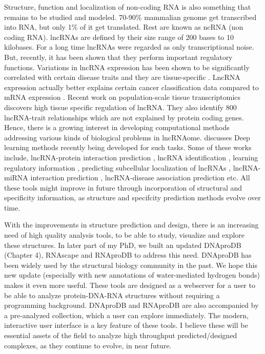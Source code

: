 Structure, function and localization of non-coding RNA is also something that remains to be studied and modeled. 70-90\% mammalian genome get transcribed into RNA, but only 1\% of it get translated. Rest are known as ncRNA (non coding RNA). lncRNAs are defined by their size range of 200 bases to 10 kilobases. For a long time lncRNAs were regarded as only transcriptional noise. But, recently, it has been shown that they perform important regulatory functions. Variations in lncRNA expression has been shown to be significantly correlated with certain disease traits \citep{wapinski2011long} and they are tissue-specific \citep{seifuddin2020lncrnakb}. LncRNA expression actually better explains certain cancer
classification data compared to mRNA expression \citep{al2019long}. Recent work on population-scale tissue transcriptomics \citep{de2021population} discovers high tissue specific regulation of lncRNA. They also identify 800 lncRNA-trait relationships which are not explained by protein coding genes. Hence, there is a growing interest in developing computational methods addressing various kinds of biological problems in lncRNAome. \citep{alam2020deep} discusses Deep learning methods recently being developed for
such tasks. Some of these works include, lncRNA-protein interaction prediction
\citep{pan2016ipminer, zhao2018bipartite, yi2018deep, zhan2019bgfe, peng2019rpiter}, lncRNA  identification \citep{baek2018lncrnanet,yang2018lncadeep, tripathi2016deeplnc},
learning regulatory information \citep{alam2019deepcnpp, alam2019deepel}, predicting subcellular localization of lncRNAs \citep{gudenas2018prediction},    lncRNA-miRNA interaction prediction \citep{huang2019predicting}, lncRNA-disease association prediction \citep{hu2019deep, xuan2019dual, al2019long, xuan2019graph} etc. All these tools might improve in future through incorporation of structural and specificity information, as structure and specifcity prediction methods evolve over time.

With the improvements in structure prediction and design, there is an increasing need of high quality analysis tools, to be able to study, visualize and explore these structures. In later part of my PhD, we built an updated DNAproDB (Chapter 4), RNAscape \citep{Mitra2024rnascape} and RNAproDB to address this need. DNAproDB \citep{Sagendorf2017, Sagendorf2020} has been widely used by the structural biology community in the past. We hope this new update (especially with new annotations of water-mediated hydrogen bonds) makes it even more useful. These tools are designed as a webserver for a user to be able to analyze protein-DNA-RNA structures without requiring a programming background. DNAproDB and RNAproDB are also accompanied by a pre-analyzed collection, which a user can explore immediately. The modern, interactive user interface is a key feature of these tools. I believe these will be essential assets of the field to analyze high throughput predicted/designed complexes, as they continue to evolve, in near future. 

